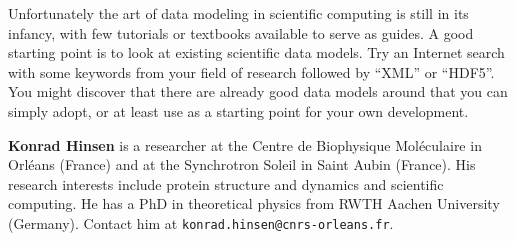 \documentclass{csmagazine}
\begin{document}
Unfortunately the art of data modeling in scientific computing is still in its infancy, with few tutorials or textbooks available to serve as guides. A good starting point is to look at existing scientific data models. Try an Internet search with some keywords from your field of research followed by ``XML'' or ``HDF5''. You might discover that there are already good data models around that you can simply adopt, or at least use as a starting point for your own development.

\textbf{Konrad Hinsen} is a researcher at the Centre de Biophysique
Mol\'eculaire in Orl\'eans (France) and at the Synchrotron Soleil in
Saint Aubin (France). His research interests include protein structure
and dynamics and scientific computing. He has a PhD in theoretical
physics from RWTH Aachen University (Germany). Contact him at
\texttt{konrad.hinsen@cnrs-orleans.fr}.



\end{document}
